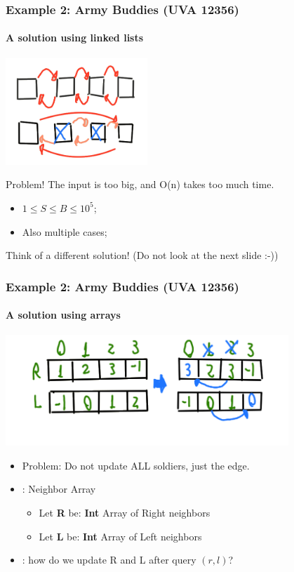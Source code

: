 \documentclass{beamer}
\begin{document}
\begin{frame}
  \frametitle{Example 2: Army Buddies (UVA 12356)}
  \framesubtitle{A solution using linked lists}

  \begin{center}
    \includegraphics[width=0.4\textwidth]{img/army-list}
  \end{center}

  \alert{Problem!} The input is too big, and O(n) takes too much time.

  \begin{itemize}
  \item $1 \leq S \leq B \leq 10^5$;\hfill {}
  \item Also \alert{multiple cases};\hfill {}
  \end{itemize}

  \bigskip

  Think of a different solution! (Do not look at the next slide :-))
\end{frame}


\begin{frame}[t]
  \frametitle{Example 2: Army Buddies (UVA 12356)}
  \framesubtitle{A solution using arrays}

  \includegraphics[width=0.8\textwidth]{img/army-array}

  \begin{itemize}
  \item \alert{Problem}: Do not update ALL soldiers, just the edge.
  \item {}: Neighbor Array
    \begin{itemize}
    \item Let {\bf R} be: {\bf Int} Array of Right neighbors
    \item Let {\bf L} be: {\bf Int} Array of Left neighbors
    \end{itemize}
  \item {}: how do we update R and L after query $(r,l)$?\\
  \end{itemize}
\end{frame}
\end{document}
